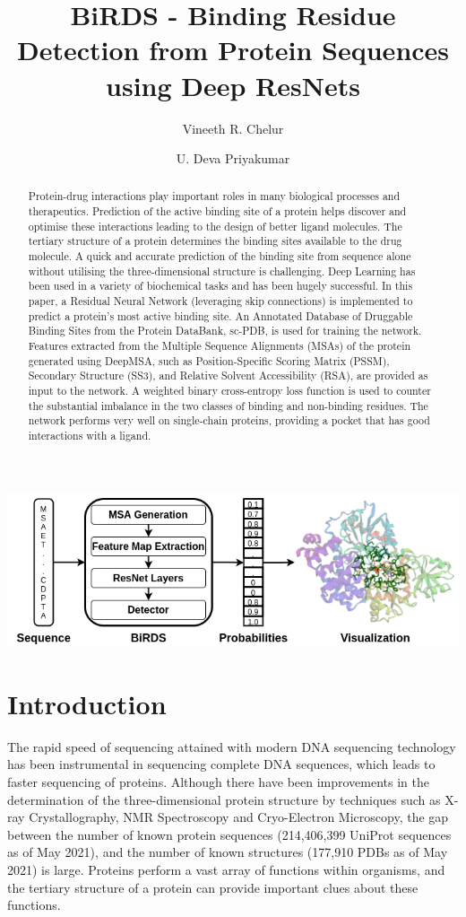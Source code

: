 \documentclass[journal=jcisd8,manuscript=article]{achemso}
\author{Vineeth R. Chelur}
\author{U. Deva Priyakumar}
\affiliation[IIIT-H]
{Center for Computational Natural Sciences \& Bioinformatics \\ International Institute of Information Technology \\ Hyderabad - 500032, India}
\title[BiRDS - Binding Residue Detection from Protein Sequences using Deep ResNets]
  {BiRDS - Binding Residue Detection from Protein Sequences using Deep ResNets
  }
\begin{document}
\begin{tocentry}
    \centering
    \includegraphics[width=\textwidth,height=0.15\textheight]{graphical_toc}
\end{tocentry}

\begin{abstract}
    \noindent Protein-drug interactions play important roles in many biological processes and therapeutics. Prediction of the active binding site of a protein helps discover and optimise these interactions leading to the design of better ligand molecules. The tertiary structure of a protein determines the binding sites available to the drug molecule. A quick and accurate prediction of the binding site from sequence alone without utilising the three-dimensional structure is challenging. Deep Learning has been used in a variety of biochemical tasks and has been hugely successful. In this paper, a Residual Neural Network (leveraging skip connections) is implemented to predict a protein's most active binding site. An Annotated Database of Druggable Binding Sites from the Protein DataBank, sc-PDB, is used for training the network. Features extracted from the Multiple Sequence Alignments (MSAs) of the protein generated using DeepMSA, such as Position-Specific Scoring Matrix (PSSM), Secondary Structure (SS3), and Relative Solvent Accessibility (RSA), are provided as input to the network. A weighted binary cross-entropy loss function is used to counter the substantial imbalance in the two classes of binding and non-binding residues. The network performs very well on single-chain proteins, providing a pocket that has good interactions with a ligand.
\end{abstract}

\section{Introduction}
\quad The rapid speed of sequencing attained with modern DNA sequencing technology has been instrumental in sequencing complete DNA sequences, which leads to faster sequencing of proteins. Although there have been improvements in the determination of the three-dimensional protein structure by techniques such as X-ray Crystallography, NMR Spectroscopy and Cryo-Electron Microscopy, the gap between the number of known protein sequences (214,406,399 UniProt sequences as of May 2021)\cite{10.1093/nar/gkaa1100}, and the number of known structures (177,910 PDBs as of May 2021)\cite{berman2000protein}\cite{burley2021rcsb} is large. Proteins perform a vast array of functions within organisms, and the tertiary structure of a protein can provide important clues about these functions.
\end{document}
